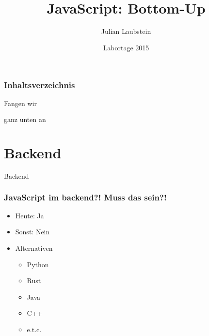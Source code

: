 \documentclass{beamer}
\title[Short title]{JavaScript: Bottom-Up} %
\author{Julian Laubstein} %
\institute[UCLA] %
{
\medskip
\textit{julianlaubstein@yahoo.de} %
}
\date{Labortage 2015} %
\begin{document}
\begin{frame}
\titlepage %
\end{frame}

\begin{frame}
\frametitle{Inhaltsverzeichnis} %
\tableofcontents %
\end{frame}



\begin{frame}
\Huge{
\centerline{Fangen wir}
\centerline{ganz unten an}
}
\end{frame}


\section{Backend}

\begin{frame}
\Huge{
\centerline{Backend}
}
\end{frame}


\begin{frame}
\frametitle{JavaScript im backend?! Muss das sein?!}
\begin{itemize}
\item Heute: Ja
\item Sonst: Nein
\item Alternativen
\begin{itemize}
\item Python
\item Rust
\item Java
\item C++
\item e.t.c.
\end{itemize}
\end{itemize}
\end{frame}
\end{document}
